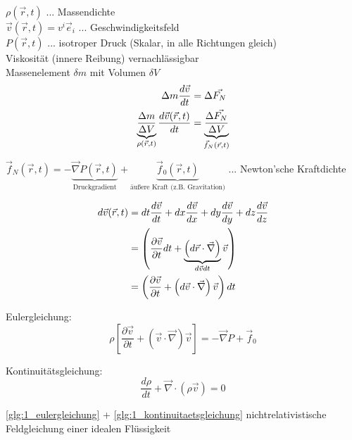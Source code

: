 \documentclass[a4paper, 11pt]{article}
\numberwithin{equation}{section}
\newcommand{\ubtext}[2]{\underbrace{#1}_{\mathclap{\text{#2}}}}
\begin{document}
$\rho(\vec{r}, t)$ $...$ Massendichte\\
$\vec{v}(\vec{r}, t) = v^i \vec{e}_i$ $...$ Geschwindigkeitsfeld\\
$P(\vec{r}, t)$ $...$ isotroper Druck (Skalar, in alle Richtungen gleich) \\
Viskosität (innere Reibung) vernachlässigbar \\
Massenelement $\delta m$ mit Volumen $\delta V$
\begin{align}
\Delta m \dfrac{d\vec{v}}{dt} &= \Delta \vec{F_N} \nonumber \\ 
\underbrace{\dfrac{\Delta m}{\Delta V}}_{\mathclap{\rho(\vec{r}, t)}} \dfrac{d\vec{v}(\vec{r}, t)}{dt} &= \underbrace{\dfrac{\Delta \vec{F_N}}{\Delta V}}_{\mathclap{\vec{f}_N(\vec{r}, t)}}
\end{align}

$\vec{f}_N(\vec{r}, t) = - \underbrace{ \vec{\nabla}  P (\vec{r}, t)}_{\text{Druckgradient}} + \underbrace{\vec{f}_0 (\vec{r}, t)}_{\text{äußere Kraft (z.B. Gravitation)}}$ $...$ Newton'sche Kraftdichte

\begin{equation}
\begin{aligned}
d \vec{v}(\vec{r}, t) &= dt \dfrac{d\vec{v}}{dt} +dx \dfrac{d\vec{v}}{dx} +dy \dfrac{d\vec{v}}{dy} + dz \dfrac{d\vec{v}}{dz}\\
&= \left(\dfrac{\partial \vec{v}}{\partial t} dt + \ubtext{ \left( d\vec{r} \cdot \vec{\nabla} \right)}{$d\vec{v} dt$}  \vec{v} \right) \\
&= \left(\dfrac{\partial \vec{v}}{\partial t} + \left( d\vec{v} \cdot \vec{\nabla} \right)  \vec{v} \right) dt \\
\end{aligned}
\end{equation}

Eulergleichung:
\begin{equation}\label{glg:1_eulergleichung}
\rho \left[ \dfrac{\partial \vec{v}}{\partial t} + \left( \vec{v} \cdot \vec{\nabla} \right) \vec{v} \right] = - \vec{\nabla} P + \vec{f}_0
\end{equation}

Kontinuitätsgleichung:
\begin{equation}
\dfrac{d \rho}{dt} + \vec{\nabla} \cdot \left( \rho \vec{v} \right) = 0
\label{glg:1_kontinuitaetsgleichung}
\end{equation}

\ref{glg:1_eulergleichung} + \ref{glg:1_kontinuitaetsgleichung} nichtrelativistische Feldgleichung einer idealen Flüssigkeit
\end{document}
